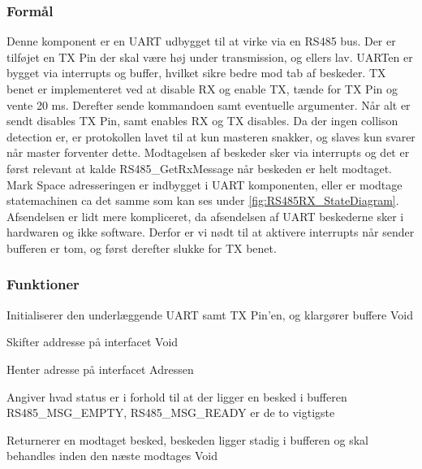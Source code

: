 \subsubsection{Formål}
Denne komponent er en UART udbygget til at virke via en RS485 bus. 
Der er tilføjet en TX Pin der skal være høj under transmission, og 
ellers lav. UARTen er bygget via interrupts og buffer, 
hvilket sikre bedre mod tab af beskeder. TX benet er implementeret ved 
at disable RX og enable TX, tænde for TX Pin og vente 20 ms. Derefter 
sende kommandoen samt eventuelle argumenter. Når alt er sendt disables 
TX Pin, samt enables RX og TX disables. Da der ingen collison detection 
er, er protokollen lavet til at kun masteren snakker, og slaves kun 
svarer når master forventer dette. Modtagelsen af beskeder sker via interrupts 
og det er først relevant at kalde RS485\_GetRxMessage når beskeden er helt 
modtaget. Mark Space adresseringen er indbygget i UART komponenten, eller 
er modtage statemachinen ca det samme som kan ses under \ref{fig:RS485RX_StateDiagram}. 
Afsendelsen er lidt mere kompliceret, da afsendelsen af UART beskederne sker 
i hardwaren og ikke software. Derfor er vi nødt til at aktivere interrupts 
når sender bufferen er tom, og først derefter slukke for TX benet.


\subsubsection{Funktioner}

{Initialiserer den underlæggende UART samt 
TX Pin'en, og klargører buffere}
{Void}
{}

{Skifter addresse på interfacet}
{Void}
{
}

{Henter adresse på interfacet}
{Adressen}
{}

{Angiver hvad status er i forhold til at der ligger en besked i bufferen}
{RS485\_MSG\_EMPTY, RS485\_MSG\_READY er de to vigtigste}
{}

{Returnerer en modtaget besked, beskeden ligger stadig i bufferen og skal behandles inden den næste modtages}
{Void}
{
}

